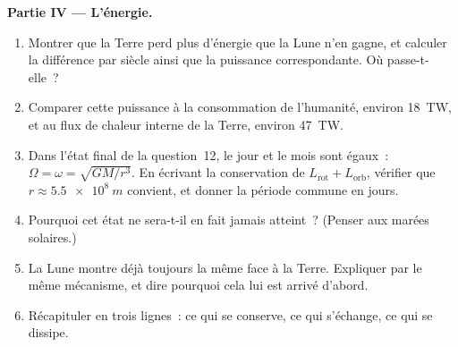 \begin{problem}
\medskip
\noindent\textbf{Partie IV --- L'énergie.}
\begin{enumerate}[resume]
  \item Montrer que la Terre perd plus d'énergie que la Lune n'en gagne,
        et calculer la différence par siècle ainsi que la puissance
        correspondante. Où passe-t-elle~?
  \item Comparer cette puissance à la consommation de l'humanité,
        environ \qty{18}{TW}, et au flux de chaleur interne de la Terre,
        environ \qty{47}{TW}.
  \item Dans l'état final de la question~12, le jour et le mois sont
        égaux~: $\Omega = \omega = \sqrt{GM/r^3}$. En écrivant la
        conservation de $L_{\text{rot}} + L_{\text{orb}}$, vérifier que
        $r \approx
        \qty{5.5e8}{m}$ convient, et donner la période commune en jours.
  \item Pourquoi cet état ne sera-t-il en fait jamais atteint~? (Penser
        aux marées solaires.)
  \item La Lune montre déjà toujours la même face à la Terre. Expliquer
        par le même mécanisme, et dire pourquoi cela lui est arrivé
        d'abord.
  \item Récapituler en trois lignes~: ce qui se conserve, ce qui
        s'échange, ce qui se dissipe.
\end{enumerate}
\end{problem}
